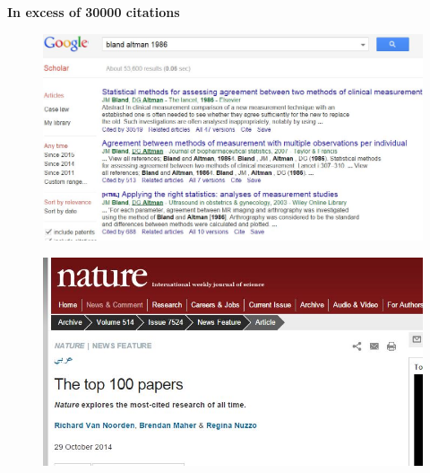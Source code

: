 \documentclass[compress]{beamer}        %
\begin{document}



\begin{frame}
\textbf{In excess of 30000 citations}
	\begin{figure}
\centering
\includegraphics[width=0.9\linewidth]{BACITE}

\label{fig:BACITE}
\end{figure}

\end{frame}
\begin{frame}
	\begin{figure}
		\centering
		\includegraphics[width=0.99\linewidth]{BACITENATURE}
		
		\label{fig:BACITENATURE}
	\end{figure}
	
\end{frame}
\end{document}
